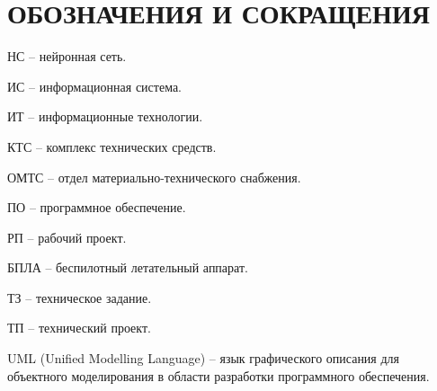 \section*{ОБОЗНАЧЕНИЯ И СОКРАЩЕНИЯ}

НС -- нейронная сеть.

ИС -- информационная система.

ИТ -- информационные технологии. 

КТС -- комплекс технических средств.

ОМТС -- отдел материально-технического снабжения. 

ПО -- программное обеспечение.

РП -- рабочий проект.

БПЛА -- беспилотный летательный аппарат.

ТЗ -- техническое задание.

ТП -- технический проект.

UML (Unified Modelling Language) -- язык графического описания для объектного моделирования в области разработки программного обеспечения.
